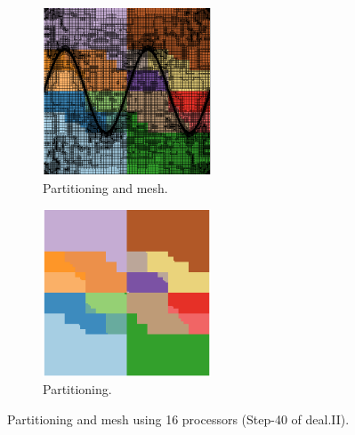 \documentclass{mc2015}
\renewcommand{\(}{\left(}
\renewcommand{\)}{\right)}
\renewcommand{\[}{\left[}
\renewcommand{\]}{\right]}
\begin{document}
\begin{figure}[H]
  \begin{subfigure}[b]{.5\textwidth}
    \centering
    \includegraphics[width=5cm]{subdomain_id_0}
    \caption{Partitioning and mesh.}
  \end{subfigure}
  \begin{subfigure}[b]{.5\textwidth}
    \centering
    \includegraphics[width=5cm]{subdomain_id_1}
    \caption{Partitioning.}
  \end{subfigure}
  \caption{Partitioning and mesh using 16 processors (Step-40 of deal.II).}
  \label{subdomain_id}
\end{figure}
\end{document}
